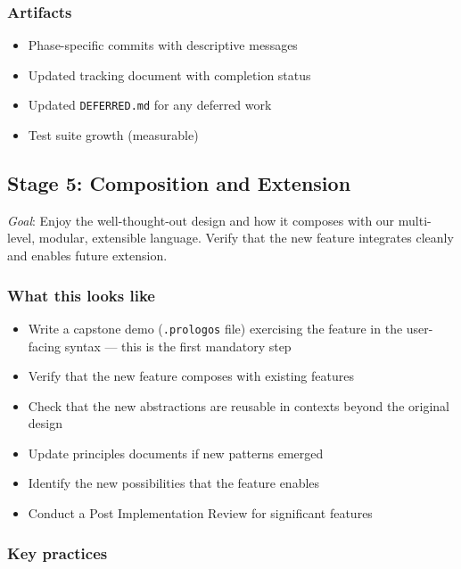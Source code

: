 \documentclass[11pt]{article}
\begin{document}
\subsubsection{Artifacts}
\label{sec:org362ac80}

\begin{itemize}
\item Phase-specific commits with descriptive messages
\item Updated tracking document with completion status
\item Updated \texttt{DEFERRED.md} for any deferred work
\item Test suite growth (measurable)
\end{itemize}
\subsection{Stage 5: Composition and Extension}
\label{sec:org8d3205f}

\emph{Goal}: Enjoy the well-thought-out design and how it composes with our
multi-level, modular, extensible language. Verify that the new feature
integrates cleanly and enables future extension.
\subsubsection{What this looks like}
\label{sec:org2c45c76}

\begin{itemize}
\item Write a capstone demo (\texttt{.prologos} file) exercising the feature in
the user-facing syntax — this is the first mandatory step
\item Verify that the new feature composes with existing features
\item Check that the new abstractions are reusable in contexts beyond the
original design
\item Update principles documents if new patterns emerged
\item Identify the new possibilities that the feature enables
\item Conduct a Post Implementation Review for significant features
\end{itemize}
\subsubsection{Key practices}
\label{sec:orgcfb9ec9}
\end{document}

